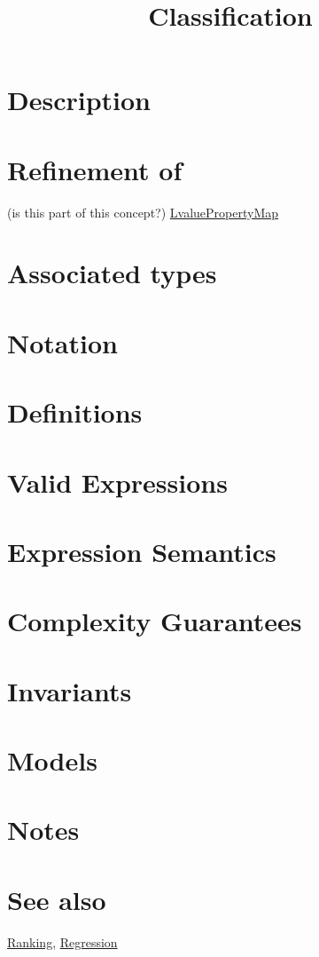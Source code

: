 \documentclass{article}
\begin{document}
\title{Classification}
\maketitle

\section*{Description}
\section*{Refinement of}

(is this part of this concept?)
\href{http://www.boost.org/libs/property_map/LvaluePropertyMap.html}{LvaluePropertyMap}

\section*{Associated types}
\section*{Notation}
\section*{Definitions}
\section*{Valid Expressions}
\section*{Expression Semantics}
\section*{Complexity Guarantees}
\section*{Invariants}
\section*{Models}
\section*{Notes}
\section*{See also}

\href{\kmlroot/ranking.html}{Ranking},
\href{\kmlroot/regression.html}{Regression}




\end{document}
